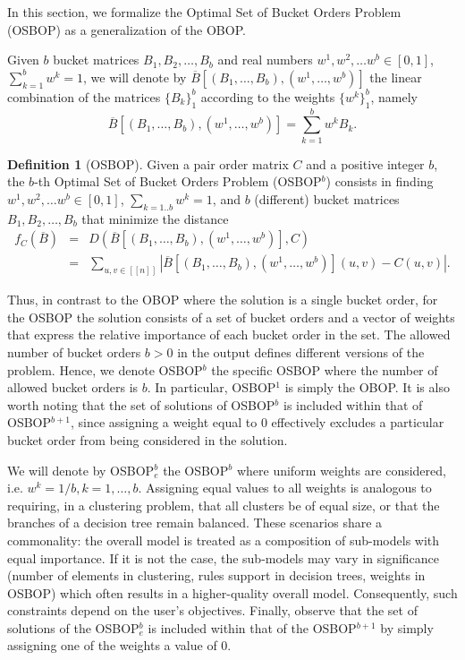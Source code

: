 \documentclass[preprint,12pt]{article}
\theoremstyle{definition}
\newtheorem{definition}{Definition}[section]
\theoremstyle{remark}
\theoremstyle{example} %
\begin{document}
In this section, we formalize the Optimal Set of Bucket Orders Problem (OSBOP) as a generalization of the  OBOP.

Given $b$ bucket matrices $B_1,B_2,\dots, B_b$ and real numbers $w^1,w^2,\dots w^b\in [0,1]$, $\sum_{k=1}^b w^k =1$, we will denote by $\overline{B}[(B_1,\dots,B_b),(w^1,\dots,w^b)]$ the linear combination of the matrices $\{B_k\}_1^b$ according to the weights $\{w^k\}_1^b$, namely
    \begin{equation}\label{Bbar}
    \overline{B}[(B_1,\dots,B_b),(w^1,\dots,w^b)]=\sum_{k=1}^b w^k B_k.
    \end{equation}


\begin{definition}[OSBOP]
Given a pair order matrix $C$ and a positive integer $b$, the $b$-th Optimal Set of Bucket Orders Problem ({\rm OSBOP}$^b$) consists in finding $w^1,w^2,\dots w^b\in [0,1]$, $\sum_{k=1..b} w^k =1$,  and $b$ (different) bucket matrices $B_1,B_2,\dots, B_b$ that minimize the distance
\begin{eqnarray}%
f_C(\overline{B}) & = & D(\overline{B}[(B_1,\dots,B_b),(w^1,\dots,w^b)],C)  \nonumber\\
& = &\sum_{u,v\in [[n]]} |\overline{B}[(B_1,\dots,B_b),(w^1,\dots,w^b)](u,v)-C(u,v)|. \label{fC}
\end{eqnarray}
\end{definition}




Thus, in contrast to the OBOP where the solution is a single bucket order, for the OSBOP the solution consists of a set of bucket orders and a vector of weights that express the relative importance of each bucket order in the set. 
The allowed number of bucket orders $b>0$ in the output defines different versions of the problem. Hence, we denote OSBOP$^b$ the specific OSBOP  where the number of allowed bucket orders is $b$. 
In particular, OSBOP$^1$ is simply the  OBOP. It is also worth noting that the set of solutions of OSBOP$^b$ is included within that of OSBOP$^{b+1}$, since assigning a weight equal to $0$ effectively excludes a particular bucket order from being considered in the solution. 

We will denote by OSBOP$_e^b$ the OSBOP$^b$ where uniform weights are considered, i.e. $w^k = 1/b, k=1, \dots, b$. 
Assigning equal values to all weights is analogous to requiring, in a clustering problem, that all clusters be of equal size, or that the branches of a decision tree remain balanced. These scenarios share a commonality: the overall model is treated as a composition of sub-models with equal importance. If it is not the case, the sub-models may vary in significance (number of elements in clustering, rules support in decision trees, weights in OSBOP) which often results in a higher-quality overall model. Consequently, such constraints depend on the user’s objectives. Finally, observe that the set of solutions of the OSBOP$^b_e$ is included within that of the OSBOP$^{b+1}$ by simply assigning one of the weights a value of 0. 
\end{document}
